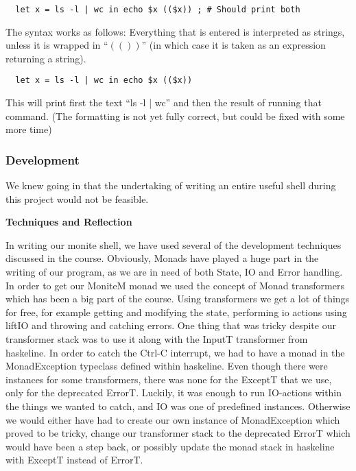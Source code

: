 \documentclass[11pt,a4paper]{article}
\begin{document}
\begin{verbatim}
  let x = ls -l | wc in echo $x (($x)) ; # Should print both
\end{verbatim}




The syntax works as follows: Everything that is entered is interpreted as
strings, unless it is wrapped in ``$\left( \left(  \right) \right)$'' (in which
case it is taken as an expression returning a string).

\begin{verbatim}
  let x = ls -l | wc in echo $x (($x))
\end{verbatim}

This will print first the text ``ls -l | wc'' and then the result of running
that command. (The formatting is not yet fully correct, but could be fixed with
some more time)

\subsubsection{Development}

We knew going in that the undertaking of writing an entire useful shell during
this project would not be feasible.


\textbf{Techniques and Reflection}

In writing our monite shell, we have used several of the development techniques
discussed in the course. Obviously, Monads have played a huge part in the
writing of our program, as we are in need of both State, IO and Error handling.
In order to get our MoniteM monad we used the concept of Monad transformers
which has been a big part of the course. Using transformers we get a lot of
things for free, for example getting and modifying the state, performing io
actions using liftIO and throwing and catching errors. One thing that was
tricky despite our transformer stack was to use it along with the InputT
transformer from haskeline. In order to catch the Ctrl-C interrupt, we had to
have a monad in the MonadException typeclass defined within haskeline. Even
though there were instances for some transformers, there was none for the
ExceptT that we use, only for the deprecated ErrorT. Luckily, it was enough to
run IO-actions within the things we wanted to catch, and IO was one of
predefined instances. Otherwise we would either have had to create our own
instance of MonadException which proved to be tricky, change our transformer
stack to the deprecated ErrorT which would have been a step back, or possibly
update the monad stack in haskeline with ExceptT instead of ErrorT.
\end{document}
